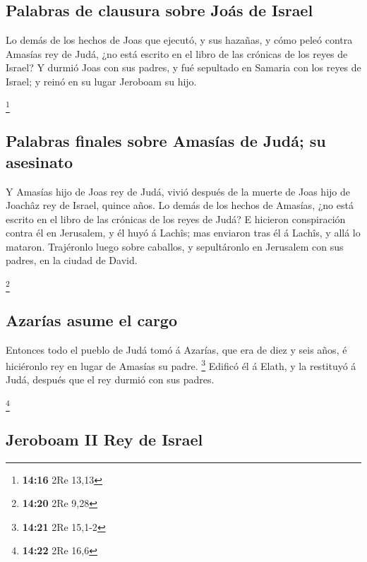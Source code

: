 \hypertarget{palabras-de-clausura-sobre-jouxe1s-de-israel}{%
\subsection{Palabras de clausura sobre Joás de
Israel}\label{palabras-de-clausura-sobre-jouxe1s-de-israel}}

 Lo demás de los hechos de Joas que ejecutó, y sus hazañas,
y cómo peleó contra Amasías rey de Judá, ¿no está escrito en el libro de
las crónicas de los reyes de Israel?  Y durmió Joas con sus
padres, y fué sepultado en Samaria con los reyes de Israel; y reinó en
su lugar Jeroboam su hijo.

\footnote{\textbf{14:16} 2Re 13,13}

\hypertarget{palabras-finales-sobre-amasuxedas-de-juduxe1-su-asesinato}{%
\subsection{Palabras finales sobre Amasías de Judá; su
asesinato}\label{palabras-finales-sobre-amasuxedas-de-juduxe1-su-asesinato}}

 Y Amasías hijo de Joas rey de Judá, vivió después de la
muerte de Joas hijo de Joachâz rey de Israel, quince años. 
Lo demás de los hechos de Amasías, ¿no está escrito en el libro de las
crónicas de los reyes de Judá?  E hicieron conspiración
contra él en Jerusalem, y él huyó á Lachîs; mas enviaron tras él á
Lachîs, y allá lo mataron.  Trajéronlo luego sobre
caballos, y sepultáronlo en Jerusalem con sus padres, en la ciudad de
David.

\footnote{\textbf{14:20} 2Re 9,28}

\hypertarget{azaruxedas-asume-el-cargo}{%
\subsection{Azarías asume el cargo}\label{azaruxedas-asume-el-cargo}}

 Entonces todo el pueblo de Judá tomó á Azarías, que era de
diez y seis años, é hiciéronlo rey en lugar de Amasías su padre.
\footnote{\textbf{14:21} 2Re 15,1-2}  Edificó él á Elath, y
la restituyó á Judá, después que el rey durmió con sus padres.

\footnote{\textbf{14:22} 2Re 16,6}

\hypertarget{jeroboam-ii-rey-de-israel}{%
\subsection{Jeroboam II Rey de Israel}\label{jeroboam-ii-rey-de-israel}}

